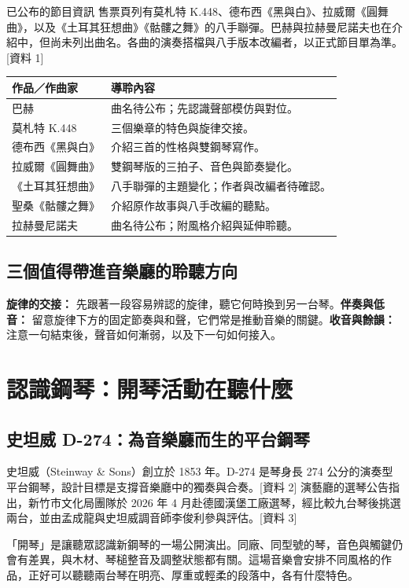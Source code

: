 \documentclass[UTF8,12pt,a4paper,fontset=none]{ctexart}
\newcommand{\src}[1]{{\small\color{accent}[資料 #1]}}
\begin{document}
\begin{listen}{已公布的節目資訊}
售票頁列有莫札特 K.448、德布西《黑與白》、拉威爾《圓舞曲》，以及《土耳其狂想曲》《骷髏之舞》的八手聯彈。巴赫與拉赫曼尼諾夫也在介紹中，但尚未列出曲名。各曲的演奏搭檔與八手版本改編者，以正式節目單為準。\src{1}
\end{listen}

\begin{tabularx}{\textwidth}{@{}p{}X@{}}
\toprule
\textbf{作品／作曲家} & \textbf{導聆內容}\\\midrule
巴赫 & 曲名待公布；先認識聲部模仿與對位。\\
莫札特 K.448 & 三個樂章的特色與旋律交接。\\
德布西《黑與白》 & 介紹三首的性格與雙鋼琴寫作。\\
拉威爾《圓舞曲》 & 雙鋼琴版的三拍子、音色與節奏變化。\\
《土耳其狂想曲》 & 八手聯彈的主題變化；作者與改編者待確認。\\
聖桑《骷髏之舞》 & 介紹原作故事與八手改編的聽點。\\
拉赫曼尼諾夫 & 曲名待公布；附風格介紹與延伸聆聽。\\\bottomrule
\end{tabularx}

\subsection{三個值得帶進音樂廳的聆聽方向}
\textbf{旋律的交接：} 先跟著一段容易辨認的旋律，聽它何時換到另一台琴。\textbf{伴奏與低音：} 留意旋律下方的固定節奏與和聲，它們常是推動音樂的關鍵。\textbf{收音與餘韻：} 注意一句結束後，聲音如何漸弱，以及下一句如何接入。
\clearpage
\section{認識鋼琴：開琴活動在聽什麼}
\subsection{史坦威 D-274：為音樂廳而生的平台鋼琴}
史坦威（Steinway \& Sons）創立於 1853 年。D-274 是琴身長 274 公分的演奏型平台鋼琴，設計目標是支撐音樂廳中的獨奏與合奏。\src{2} 演藝廳的選琴公告指出，新竹市文化局團隊於 2026 年 4 月赴德國漢堡工廠選琴，經比較九台琴後挑選兩台，並由孟成龍與史坦威調音師李俊利參與評估。\src{3}

「開琴」是讓聽眾認識新鋼琴的一場公開演出。同廠、同型號的琴，音色與觸鍵仍會有差異，與木材、琴槌整音及調整狀態都有關。這場音樂會安排不同風格的作品，正好可以聽聽兩台琴在明亮、厚重或輕柔的段落中，各有什麼特色。
\end{document}
